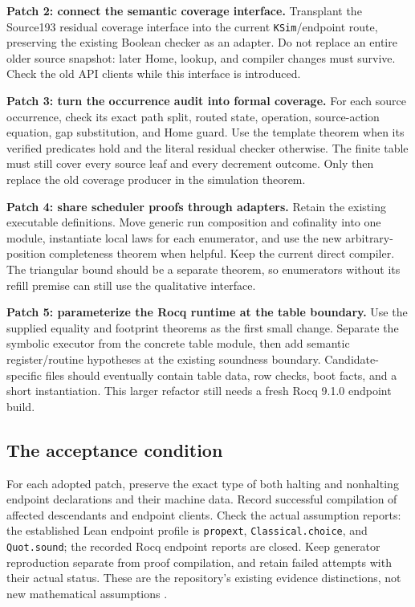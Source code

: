 \documentclass[11pt,letterpaper]{article}
\theoremstyle{definition}
\theoremstyle{remark}
\newcommand{\code}[1]{\texttt{#1}}
\begin{document}
\textbf{Patch 2: connect the semantic coverage interface.}
Transplant the Source193 residual coverage interface into the current
\code{KSim}/endpoint route, preserving the existing Boolean checker as an
adapter. Do not replace an entire older source snapshot: later Home,
lookup, and compiler changes must survive. Check the old API clients while
this interface is introduced.

\textbf{Patch 3: turn the occurrence audit into formal coverage.}
For each source occurrence, check its exact path split, routed state,
operation, source-action equation, gap substitution, and Home guard.
Use the template theorem when its verified predicates hold and the literal
residual checker otherwise. The finite table must still cover every source
leaf and every decrement outcome. Only then replace the old coverage
producer in the simulation theorem.

\textbf{Patch 4: share scheduler proofs through adapters.}
Retain the existing executable definitions. Move generic run composition
and cofinality into one module, instantiate local laws for each enumerator,
and use the new arbitrary-position completeness theorem when helpful.
Keep the current direct compiler. The triangular bound should be a separate
theorem, so enumerators without its refill premise can still use the
qualitative interface.

\textbf{Patch 5: parameterize the Rocq runtime at the table boundary.}
Use the supplied equality and footprint theorems as the first small change.
Separate the symbolic executor from the concrete table module, then add
semantic register/routine hypotheses at the existing soundness boundary.
Candidate-specific files should eventually contain table data, row checks,
boot facts, and a short instantiation. This larger refactor still needs a
fresh Rocq 9.1.0 endpoint build.

\subsection{The acceptance condition}

For each adopted patch, preserve the exact type of both halting and
nonhalting endpoint declarations and their machine data. Record successful
compilation of affected descendants and endpoint clients. Check the actual
assumption reports: the established Lean endpoint profile is
\code{propext}, \code{Classical.choice}, and \code{Quot.sound}; the recorded
Rocq endpoint reports are closed. Keep generator reproduction separate from
proof compilation, and retain failed attempts with their actual status.
These are the repository's existing evidence distinctions, not new
mathematical assumptions \cite{verification,phase15}.
\end{document}
